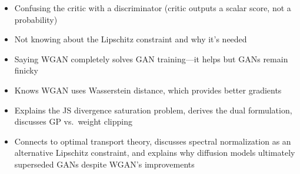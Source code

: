 \begin{interviewq}
\redflags
\begin{itemize}
    \item Confusing the critic with a discriminator (critic outputs a scalar score, not a probability)
    \item Not knowing about the Lipschitz constraint and why it's needed
    \item Saying WGAN completely solves GAN training---it helps but GANs remain finicky
\end{itemize}


\goodgreat
\begin{itemize}
    \item {} Knows WGAN uses Wasserstein distance, which provides better gradients
    \item {} Explains the JS divergence saturation problem, derives the dual formulation, discusses GP vs.\ weight clipping
    \item {} Connects to optimal transport theory, discusses spectral normalization as an alternative Lipschitz constraint, and explains why diffusion models ultimately superseded GANs despite WGAN's improvements
\end{itemize}

\end{interviewq}
